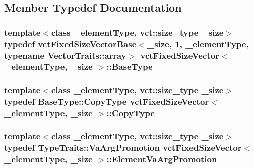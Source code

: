 \subsection{Member Typedef Documentation}
\hypertarget{classvct_fixed_size_vector_a04088d3a17a06af2d59f3bd99c42fb75}{
\subsubsection[{Base\-Type}]{\setlength{\rightskip}{0pt plus 5cm}template$<$class \-\_\-element\-Type, vct\-::size\-\_\-type \-\_\-size$>$ typedef {\bf vct\-Fixed\-Size\-Vector\-Base}$<$\-\_\-size, 1, \-\_\-element\-Type, typename {\bf Vector\-Traits\-::array}$>$ {\bf vct\-Fixed\-Size\-Vector}$<$ \-\_\-element\-Type, \-\_\-size $>$\-::{\bf Base\-Type}}}\label{classvct_fixed_size_vector_a04088d3a17a06af2d59f3bd99c42fb75}
\hypertarget{classvct_fixed_size_vector_afcfc466ed71975aef98c2789fd3e4dcf}{
\subsubsection[{Copy\-Type}]{\setlength{\rightskip}{0pt plus 5cm}template$<$class \-\_\-element\-Type, vct\-::size\-\_\-type \-\_\-size$>$ typedef {\bf Base\-Type\-::\-Copy\-Type} {\bf vct\-Fixed\-Size\-Vector}$<$ \-\_\-element\-Type, \-\_\-size $>$\-::{\bf Copy\-Type}}}\label{classvct_fixed_size_vector_afcfc466ed71975aef98c2789fd3e4dcf}
\hypertarget{classvct_fixed_size_vector_a1adb96488f833cc25746022bdb2faf80}{
\subsubsection[{Element\-Va\-Arg\-Promotion}]{\setlength{\rightskip}{0pt plus 5cm}template$<$class \-\_\-element\-Type, vct\-::size\-\_\-type \-\_\-size$>$ typedef Type\-Traits\-::\-Va\-Arg\-Promotion {\bf vct\-Fixed\-Size\-Vector}$<$ \-\_\-element\-Type, \-\_\-size $>$\-::{\bf Element\-Va\-Arg\-Promotion}}}\label{classvct_fixed_size_vector_a1adb96488f833cc25746022bdb2faf80}
